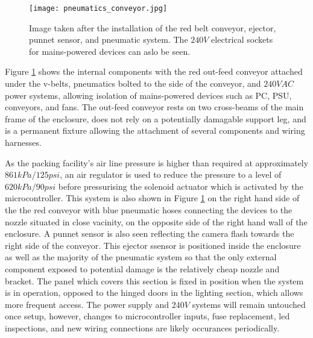 \documentclass[fleqn,twoside]{article}
\begin{document}
\begin{figure}
	\begin{center}
		\texttt{[image: pneumatics\_conveyor.jpg]}
	\end{center}
	\caption{Image taken after the installation of the red belt conveyor, ejector, punnet sensor, and pneumatic system. The $240V$ electrical sockets for mains-powered devices can aslo be seen.}
	\label{fig:pneumatics_conveyor}
\end{figure} 

Figure \ref{fig:pneumatics_conveyor} shows the internal components with the red out-feed conveyor attached under the v-belts, pneumatics bolted to the side of the conveyor, and $240VAC$ power systems, allowing isolation of mains-powered devices such as PC, PSU, conveyors, and fans. The out-feed conveyor rests on two cross-beams of the main frame of the enclosure, does not rely on a potentially damagable support leg, and is a permanent fixture allowing the attachment of several components and wiring harnesses. 

As the packing facility's air line pressure is higher than required at approximately $861kPa/125psi$, an air regulator is used to reduce the pressure to a level of $620kPa/90psi$ before pressurising the solenoid actuator which is activated by the microcontroller. This system is also shown in Figure \ref{fig:pneumatics_conveyor} on the right hand side of the the red conveyor with blue pneumatic hoses connecting the devices to the nozzle situated in close vacinity, on the opposite side of the right hand wall of the enclosure. A punnet sensor is also seen reflecting the camera flash towards the right side of the conveyor. This ejector ssensor is positioned inside the enclosure as well as the majority of the pneumatic system so that the only external component exposed to potential damage is the relatively cheap nozzle and bracket. The panel which covers this section is fixed in position when the system is in operation, opposed to the hinged doors in the lighting section, which allows more frequent access. The power supply and $240V$ systems will remain untouched once setup, however, changes to microcontroller inputs, fuse replacement, led inspections, and new wiring connections are likely occurances periodically.
\end{document}
